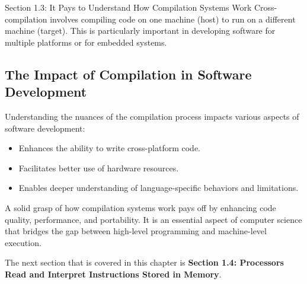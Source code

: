 \begin{notes}{Section 1.3: It Pays to Understand How Compilation Systems Work}
    Cross-compilation involves compiling code on one machine (host) to run on a different machine (target). This is particularly important in developing software for multiple platforms or for embedded 
    systems.
    
    \subsection*{The Impact of Compilation in Software Development}

    Understanding the nuances of the compilation process impacts various aspects of software development:

    \begin{itemize}
        \item Enhances the ability to write cross-platform code.
        \item Facilitates better use of hardware resources.
        \item Enables deeper understanding of language-specific behaviors and limitations.
    \end{itemize}
    
    A solid grasp of how compilation systems work pays off by enhancing code quality, performance, and portability. It is an essential aspect of computer science that bridges the gap between high-level 
    programming and machine-level execution.
\end{notes}

The next section that is covered in this chapter is \textbf{Section 1.4: Processors Read and Interpret Instructions Stored in Memory}.

